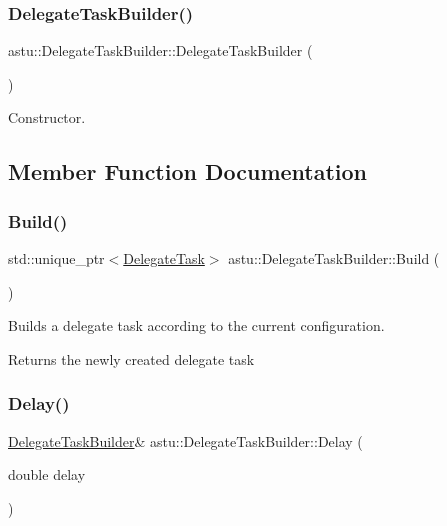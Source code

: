 \subsubsection{\texorpdfstring{Delegate\+Task\+Builder()}{DelegateTaskBuilder()}}
{\footnotesize\ttfamily astu\+::\+Delegate\+Task\+Builder\+::\+Delegate\+Task\+Builder (\begin{DoxyParamCaption}{ }\end{DoxyParamCaption})}

Constructor. 

\subsection{Member Function Documentation}
\mbox{\label{classastu_1_1DelegateTaskBuilder_a381daaf1473172b912ffe84da830c75c}} 
\subsubsection{\texorpdfstring{Build()}{Build()}}
{\footnotesize\ttfamily std\+::unique\+\_\+ptr$<$\hyperlink{classastu_1_1DelegateTask}{Delegate\+Task}$>$ astu\+::\+Delegate\+Task\+Builder\+::\+Build (\begin{DoxyParamCaption}{ }\end{DoxyParamCaption})}

Builds a delegate task according to the current configuration.

\begin{DoxyReturn}{Returns}
the newly created delegate task 
\end{DoxyReturn}
\mbox{\label{classastu_1_1DelegateTaskBuilder_afff9f95d05d896a74935287e087eb2c4}} 
\subsubsection{\texorpdfstring{Delay()}{Delay()}}
{\footnotesize\ttfamily \hyperlink{classastu_1_1DelegateTaskBuilder}{Delegate\+Task\+Builder}\& astu\+::\+Delegate\+Task\+Builder\+::\+Delay (\begin{DoxyParamCaption}\item[{double}]{delay }\end{DoxyParamCaption})}

